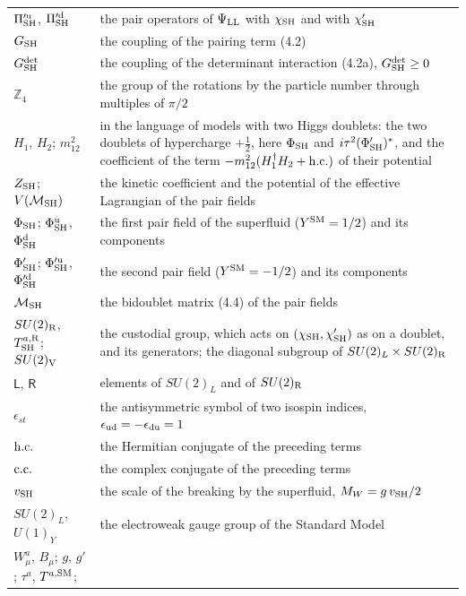 \documentclass[
  10pt,
]{article}
\begin{document}
\begin{longtable}[]{@{}
  >{\raggedright\arraybackslash}p{}
  >{\raggedright\arraybackslash}p{}@{}}
\(\Pi'^{\rm u}_{\rm SH}\), \(\Pi'^{\rm d}_{\rm SH}\) & the pair
operators of \(\Psi_{\rm LL}\) with \(\chi_{\rm SH}\) and with
\(\chi'_{\rm SH}\) \\
\(G_{\rm SH}\) & the coupling of the pairing term (4.2) \\
\(G^{\rm det}_{\rm SH}\) & the coupling of the determinant interaction
(4.2a), \(G^{\rm det}_{\rm SH}\ge0\) \\
\(\mathbb Z_4\) & the group of the rotations by the particle number
through multiples of \(\pi/2\) \\
\(H_1\), \(H_2\); \(m_{12}^2\) & in the language of models with two
Higgs doublets: the two doublets of hypercharge \(+\tfrac12\), here
\(\Phi_{\rm SH}\) and \(i\tau^2(\Phi'_{\rm SH})^*\), and the coefficient
of the term \(-m_{12}^2(H_1^\dagger H_2+{\rm h.c.})\) of their
potential \\
\(Z_{\rm SH}\); \(V(\mathcal M_{\rm SH})\) & the kinetic coefficient and
the potential of the effective Lagrangian of the pair fields \\
\(\Phi_{\rm SH}\); \(\Phi^{\rm u}_{\rm SH}\), \(\Phi^{\rm d}_{\rm SH}\)
& the first pair field of the superfluid (\(Y^{\rm SM}=1/2\)) and its
components \\
\(\Phi'_{\rm SH}\); \(\Phi'^{\rm u}_{\rm SH}\),
\(\Phi'^{\rm d}_{\rm SH}\) & the second pair field (\(Y^{\rm SM}=-1/2\))
and its components \\
\(\mathcal M_{\rm SH}\) & the bidoublet matrix (4.4) of the pair
fields \\
\(SU(2)_{\rm R}\), \(T^{a,{\rm R}}_{\rm SH}\); \(SU(2)_{\rm V}\) & the
custodial group, which acts on \((\chi_{\rm SH},\chi'_{\rm SH})\) as on
a doublet, and its generators; the diagonal subgroup of
\(SU(2)_L\times SU(2)_{\rm R}\) \\
\(\mathsf L\), \(\mathsf R\) & elements of \(SU(2)_L\) and of
\(SU(2)_{\rm R}\) \\
\(\epsilon_{st}\) & the antisymmetric symbol of two isospin indices,
\(\epsilon_{\rm ud}=-\epsilon_{\rm du}=1\) \\
\({\rm h.c.}\) & the Hermitian conjugate of the preceding terms \\
\({\rm c.c.}\) & the complex conjugate of the preceding terms \\
\(v_{\rm SH}\) & the scale of the breaking by the superfluid,
\(M_W=g\,v_{\rm SH}/2\) \\
\(SU(2)_L\), \(U(1)_Y\) & the electroweak gauge group of the Standard
Model \\
\(W^a_\mu\), \(B_\mu\); \(g\), \(g'\); \(\tau^a\), \(T^{a,{\rm SM}}\);

\end{longtable}
\end{document}
